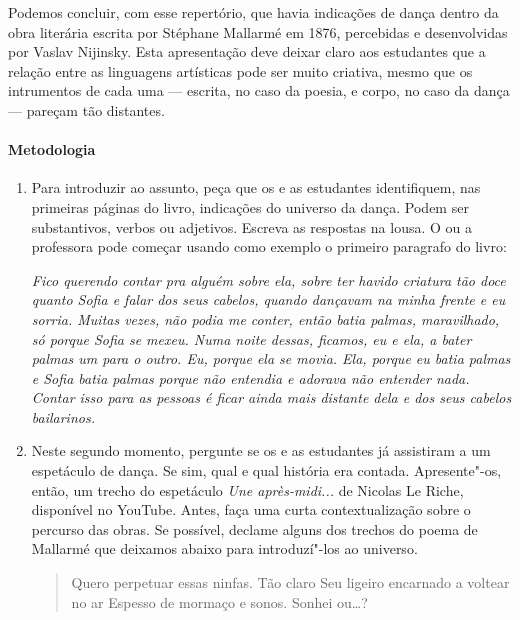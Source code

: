 \documentclass[12pt]{extarticle}
\begin{document}
Podemos concluir, com esse repertório, que havia indicações de dança dentro da
obra literária escrita por Stéphane Mallarmé em 1876, percebidas e desenvolvidas
por Vaslav Nijinsky. Esta apresentação deve deixar
claro aos estudantes que a relação entre as linguagens artísticas pode
ser muito criativa, mesmo que os intrumentos de cada uma --- escrita, no caso
da poesia, e corpo, no caso da dança --- pareçam tão distantes.

\paragraph{Metodologia}

\begin{enumerate}

  \item
  Para introduzir ao assunto, peça que os e as estudantes identifiquem, nas primeiras
  páginas do livro, indicações do universo da dança. Podem ser substantivos, verbos ou adjetivos. 
  Escreva as respostas na lousa. O ou a professora pode começar usando como exemplo
  o primeiro paragrafo do livro:

  \textit{Fico querendo contar pra alguém sobre ela,
sobre ter havido criatura tão doce quanto Sofia e falar
dos seus cabelos, quando \emph{dançavam} na minha frente e
eu sorria. Muitas vezes, não podia me conter, então batia
palmas, maravilhado, só porque Sofia se mexeu. Numa
noite dessas, ficamos, eu e ela, a bater palmas um para o
outro. Eu, porque ela se movia. Ela, porque eu batia palmas e 
Sofia batia palmas porque não entendia e adorava
não entender nada. Contar isso para as pessoas é ficar ainda 
mais distante dela e dos seus cabelos \emph{bailarinos}.}

  \item
  Neste segundo momento, pergunte se os e as estudantes já assistiram a um
  espetáculo de dança. Se sim, qual e qual história era contada. 
  Apresente"-os, então, um trecho do espetáculo \textit{Une après-midi...}
  de Nicolas Le Riche, disponível no YouTube. Antes, faça uma curta 
  contextualização sobre o percurso das obras. Se possível, declame
  alguns dos trechos do poema de Mallarmé que deixamos abaixo para introduzí"-los
  ao universo. 




\begin{verse}
Quero perpetuar essas ninfas.
                                                 Tão claro
Seu ligeiro encarnado a voltear no ar
Espesso de mormaço e sonos.
                                                 Sonhei ou…?


\end{verse}
\end{enumerate}
\end{document}
